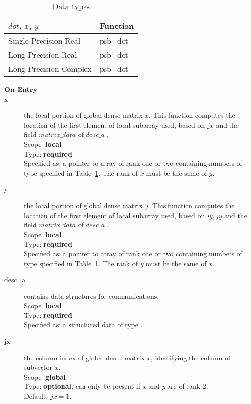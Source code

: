 \begin{table}[h]
\begin{center}
\begin{tabular}{ll}
\hline
$dot$, $x$, $y$ & {\bf Function}\\
\hline
Single Precision Real & psb\_dot\\
Long Precision Real & psb\_dot \\
Long Precision Complex & psb\_dot \\	
\hline
\end{tabular}
\end{center}
\caption{Data types\label{tab:f90dot}}
\end{table}

\begin{description}
\item[\bf On Entry]
\item[x] the local portion of global dense matrix
$x$. This function computes the location of the first element of
local subarray used, based on $jx$ and the field $matrix\_data$ of $desc\_a$ . \\
Scope: {\bf local} \\
Type: {\bf required} \\
Specified as: a pointer to array of rank one or two
containing numbers of type specified in
Table~\ref{tab:f90dot}. The rank of $x$ must be the same of $y$. 
\item[y] the local portion of global dense matrix
$y$. This function computes the location of the first element of
local subarray used, based on $iy, jy$ and the field $matrix\_data$ of $desc\_a$ . \\
Scope: {\bf local} \\
Type: {\bf required} \\
Specified as: a pointer to array of rank one or two
containing numbers of type specified in
Table~\ref{tab:f90dot}. The rank of $y$ must be the same of $x$. 
\item[desc\_a] contains data structures for communications.\\
Scope: {\bf local} \\
Type: {\bf required}\\
Specified as: a structured data of type \descdata.
\item[jx]  the column index of global dense matrix $x$,
identifying the column of subvector $x$.\\
Scope: {\bf global} \\
Type: {\bf optional}; can only be present if $x$ and $y$ are of rank 2.\\
Default: $jx = 1$.\\


\end{description}
